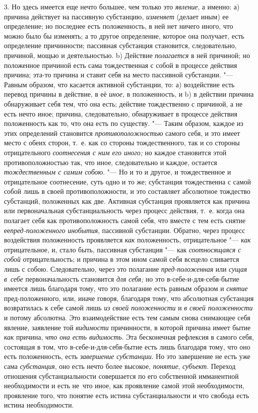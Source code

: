 3. Но здесь имеется еще нечто большее, чем только это {\em явление}, а именно:
а) причина действует на пассивную субстанцию, {\em изменяет} (делает
иным) ее определение; но последнее есть положенность, в ней нет ничего
иного, что можно было бы изменять; а то другое определение, которое она
получает, есть определение причинности; пассивная субстанция становится,
следовательно, причиной, мощью и деятельностью. b) Действие {\em полагается}
в ней причиной; но положенное причиной есть сама тождественная с собой в
процессе действия причина; эта-то причина и ставит себя на место пассивной
субстанции. "--- Равным образом, что касается активной субстанции, то:
а) воздействие есть перевод причины в действие, в её {\em иное,} в
положенность, и b) в действии причина обнаруживает себя тем, чт\'{о} она есть;
действие тождественно с причиной, а не есть нечто иное; причина,
следовательно, обнаруживает в процессе действия положенность как то, что
она есть по существу. "--- Таким образом, каждое из этих
определений становится {\em противоположностью}
самого себя, и это имеет место с обеих сторон, т.~е. как со стороны
тождественного, так и со стороны отрицательного {\em соотнесения с ним его
иного;} но каждое становится этой противоположностью так, что иное,
следовательно и каждое, остается {\em тождественным с самим собою}. "--- Но и
то и другое, и тождественное и отрицательное соотнесение, суть одно и то же;
субстанция тождественна с самой собой лишь в своей противоположности, и это
составляет абсолютное тождество субстанций, положенных как две. Активная
субстанция проявляется как причина или первоначальная субстанциальность
через процесс действия, т.~е. когда она полагает себя как противоположность
самой себя, что вместе с тем есть снятие ее{\em пред-положенного инобытия},
пассивной субстанции. Обратно, через процесс воздействия положенность
проявляется {\em как} положенность, отрицательное "--- {\em как} отрицательное,
и, стало быть, пассивная субстанция "--- как {\em соотносящаяся с собой}
отрицательность; и причина в этом ином самой себя всецело сливается лишь с
собою. Следовательно, через это полагание {\em пред-положенная} или
{\em сущая в~себе} первоначальность становится {\em для себя;} но это
в-себе-и-для-себя-бытие имеется лишь благодаря тому, что это полагание есть
равным образом и {\em снятие} пред-положенного, или, иначе говоря, благодаря
тому, что абсолютная субстанция возвратилась к себе самой лишь {\em из своей
положенности} и {\em в своей положенности} и потому абсолютна. Это
взаимодействие есть тем самым снова снимающее себя явление, заявление той
{\em видимости} причинности, в которой причина имеет бытие {\em как} причина,
{\em что она есть видимость}. Эта бесконечная рефлексия в самого себя,
состоящая в том, что в-себе-и-для-себя-бытие есть лишь благодаря тому, что
оно есть положенность, есть {\em завершение субстанции}. Но это завершение
не есть уже сама {\em субстанция}, оно есть нечто более высокое, {\em понятие},
{\em субъект}. Переход отношения субстанциальности совершается по его
собственной имманентной необходимости и есть не~что иное, как проявление
самой этой необходимости, проявление того, что понятие есть истина
субстанциальности и что свобода есть истина необходимости.

